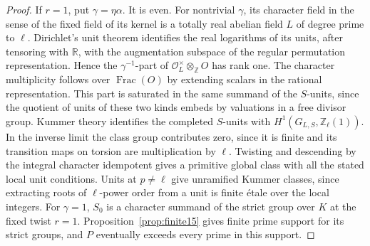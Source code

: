 \documentclass[a4paper,11pt]{article}
\theoremstyle{definition}
\theoremstyle{remark}
\newcommand{\RR}{\mathbb R}\newcommand{\CC}{\mathbb C}\newcommand{\QQ}{\mathbb Q}
\newcommand{\ZZ}{\mathbb Z}\newcommand{\ord}{\operatorname{ord}}
\numberwithin{equation}{section}
\begin{document}
\begin{proof}
If \(r=1\), put \(\gamma=\eta\alpha\). It is even. For nontrivial
\(\gamma\), its character field in the sense of the fixed field
of its kernel is a totally real abelian field \(L\) of degree
prime to \(\ell\). Dirichlet's unit theorem identifies the real
logarithms of its units, after tensoring with \(\RR\), with the
augmentation subspace of the regular permutation representation.
Hence the \(\gamma^{-1}\)-part of
\(\mathcal O_L^\times\otimes_{\ZZ}O\) has rank one. The character
multiplicity follows over \(\operatorname{Frac}(O)\) by extending
scalars in the rational representation. This part is saturated
in the same summand of the \(S\)-units, since the quotient of
units of these two kinds embeds by valuations in a free divisor
group. Kummer theory identifies the completed \(S\)-units with
\(H^1(G_{L,S},\ZZ_\ell(1))\). In the inverse limit the class
group contributes zero, since it is finite and its transition
maps on torsion are multiplication by \(\ell\). Twisting and
descending by the integral character idempotent gives a
primitive global class with all the stated local unit
conditions. Units at \(p\ne\ell\) give unramified Kummer classes,
since extracting roots of \(\ell\)-power order from a unit
is finite étale over the local integers. For \(\gamma=1\),
\(S_0\) is a character summand of the strict group over \(K\) at the fixed
twist \(r=1\). Proposition~\ref{prop:finite15} gives finite
prime support for its strict groups, and \(P\) eventually
exceeds every prime in this support.
\end{proof}
\end{document}
